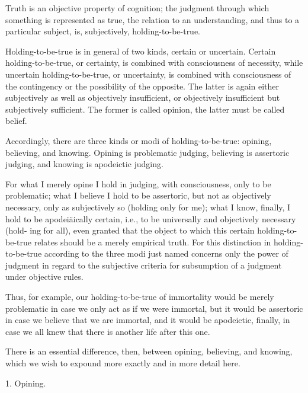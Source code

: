 Truth is an objective property of cognition;
the judgment through which something is represented as true,
the relation to an understanding, and thus to a particular subject, is,
subjectively, holding-to-be-true.

Holding-to-be-true is in general of two kinds, certain or uncertain.
Certain holding-to-be-true, or certainty, is combined with
consciousness of necessity,
while uncertain holding-to-be-true, or uncertainty, is combined
with consciousness of the contingency or the possibility of the opposite.
The latter is again either subjectively as well as objectively insufficient, or
objectively insufficient but subjectively sufficient.
The former is called opinion, the latter must be called belief.

Accordingly, there are three kinds or modi of holding-to-be-true:
opining, believing, and knowing.
Opining is problematic judging,
believing is assertoric judging,
and knowing is apodeictic judging.

For what I merely opine I hold in judging, with consciousness, only to be problematic;
what I believe I hold to be assertoric, but not as objectively necessary, only as
subjectively so (holding only for me); what I know, finally, I hold to be
apodeiäically certain, i.e., to be universally and objectively necessary (hold-
ing for all), even granted that the object to which this certain holding-to-
be-true relates should be a merely empirical truth. For this distinction in
holding-to-be-true according to the three modi just named concerns only
the power of judgment in regard to the subjective criteria for subsumption of
a judgment under objective rules.

Thus, for example, our holding-to-be-true of immortality would be
merely problematic in case we only act as if we were immortal,
but it would be assertoric in case we believe that we are immortal,
and it would be apodeictic, finally, in case we all knew that
there is another life after this one.

There is an essential difference, then, between opining, believing, and knowing,
which we wish to expound more exactly and in more detail here.

1. Opining.

